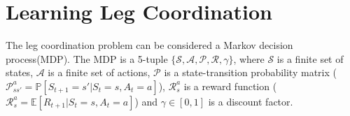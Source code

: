 
\section{Learning Leg Coordination}
The leg coordination problem can be considered a Markov decision process(MDP).
The MDP is a 5-tuple $\mathcal{\{S,A,P,R,\gamma\}}$, where $\mathcal{S}$ is a finite set of states, $\mathcal{A}$ is a finite set of actions, $\mathcal{P}$ is a state-transition probability matrix ($\mathcal{P}_{ss'}^a=\mathbb{P}[S_{t+1}=s' | S_t=s, A_t=a]$), $\mathcal{R}_s^a$ is a reward function ($\mathcal{R}_s^a = \mathbb{E}[R_{t+1} | S_t=s, A_t=a]$) and $\gamma \in [0,1]$ is a discount factor.


